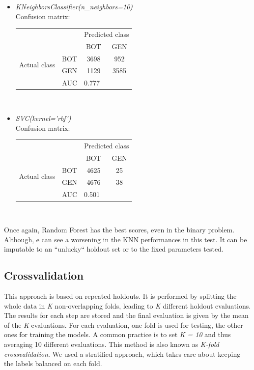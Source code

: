 \begin{itemize}
	
	\item[\PencilRight] \textit{KNeighborsClassifier(n\_neighbors=10)}\\
	Confusion matrix:
	
	{
		\centering
		\begin{tabular}{@{}cc|cc@{}}
			\multicolumn{1}{c}{} &\multicolumn{1}{c}{} &\multicolumn{2}{c}{Predicted class} \\ 
			\multicolumn{1}{c}{} & 
			\multicolumn{1}{c|}{} & 
			\multicolumn{1}{c}{BOT} & 
			\multicolumn{1}{c}{GEN}  \\
			\cline{2-4}
			\multirow[c]{2}{*}{Actual class}
			& BOT  & 3698 &  952\\
			& GEN  & 1129 & 3585\\
			\cline{2-4}
			\multicolumn{2}{r|}{AUC} & 
			\multicolumn{2}{l}{0.777}\\
		\end{tabular}\\
	}

	
	\item[\PencilRight] \textit{SVC(kernel='rbf')}\\
	Confusion matrix:
	
	{
		\centering
		\begin{tabular}{@{}cc|cc@{}}
			\multicolumn{1}{c}{} &\multicolumn{1}{c}{} &\multicolumn{2}{c}{Predicted class} \\ 
			\multicolumn{1}{c}{} & 
			\multicolumn{1}{c|}{} & 
			\multicolumn{1}{c}{BOT} & 
			\multicolumn{1}{c}{GEN}  \\
			\cline{2-4}
			\multirow[c]{2}{*}{Actual class}
			& BOT  & 4625 & 25\\
			& GEN  & 4676 & 38\\
			\cline{2-4}
			\multicolumn{2}{r|}{AUC} & 
			\multicolumn{2}{l}{0.501}\\
		\end{tabular}\\
	}

\end{itemize}

Once again, Random Forest has the best scores, even in the binary problem. Although, e can see a worsening in the KNN performances in this test. It can be imputable to an ``unlucky`` holdout set or to the fixed parameters tested.

\subsection{Crossvalidation}
This approach is based on repeated holdouts. It is performed by splitting the whole data in \textit{K} non-overlapping folds, leading to \textit{K} different holdout evaluations. The results for each step are stored and the final evaluation is given by the mean of the \textit{K} evaluations. For each evaluation, one fold is used for testing, the other ones for training the models. A common practice is to set \textit{K = 10} and thus averaging 10 different evaluations.
This method is also known as \textit{K-fold crossvalidation}. We used a stratified approach, which takes care about keeping the labels balanced on each fold.

